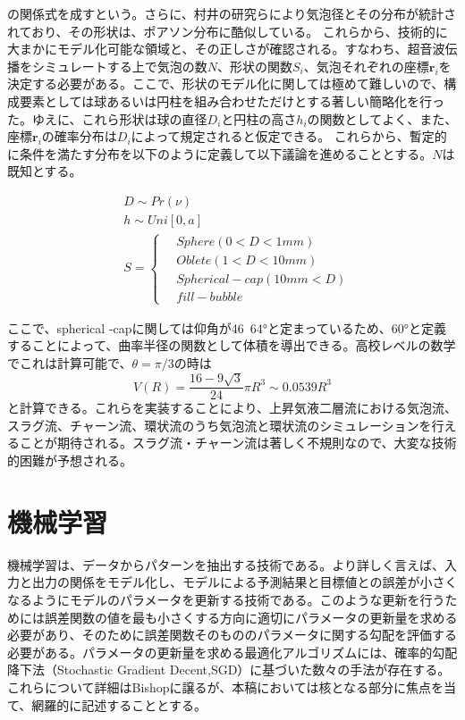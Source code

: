 \documentclass[uplatex]{suribt}
\begin{document}
の関係式を成すという。さらに、村井の研究\cite{村井祐一20222022.T011}らにより気泡径とその分布が統計されており、その形状は、ポアソン分布に酷似している。
これらから、技術的に大まかにモデル化可能な領域と、その正しさが確認される。すなわち、超音波伝播をシミュレートする上で気泡の数$N$、形状の関数$S_i$、気泡それぞれの座標$\mathbf{r}_i$を決定する必要がある。ここで、形状のモデル化に関しては極めて難しいので、構成要素としては球あるいは円柱を組み合わせただけとする著しい簡略化を行った。ゆえに、これら形状は球の直径$D_i$と円柱の高さ$h_i$の関数としてよく、また、座標$\mathbf{r}_i$の確率分布は$D_i$によって規定されると仮定できる。
これらから、暫定的に条件を満たす分布を以下のように定義して以下議論を進めることとする。$N$は既知とする。

\begin{align}
    &D \sim Pr(\nu) \\
    &h \sim Uni[0,a] \\
    &S =\left\{ \,
    \begin{aligned}
        &Sphere  (0 < D < 1 mm) \\
        &Oblete (1< D <10 mm)\\
        &Spherical-cap (10mm< D )\\
        &fill-bubble 
    \end{aligned}
\right.
\end{align}\par
ここで、spherical -capに関しては仰角が46~64°と定まっているため、60°と定義することによって、曲率半径の関数として体積を導出できる。高校レベルの数学でこれは計算可能で、$\theta=\pi/3$の時は
\begin{equation}
    V(R)=\frac{16-9\sqrt{3}}{24}\pi R^3\sim0.0539R^3
\end{equation}
と計算できる。これらを実装することにより、上昇気液二層流における気泡流、スラグ流、チャーン流、環状流のうち気泡流と環状流のシミュレーションを行えることが期待される。スラグ流・チャーン流は著しく不規則なので、大変な技術的困難が予想される。


\chapter{機械学習}
機械学習は、データからパターンを抽出する技術である。より詳しく言えば、入力と出力の関係をモデル化し、モデルによる予測結果と目標値との誤差が小さくなるようにモデルのパラメータを更新する技術である。このような更新を行うためには誤差関数の値を最も小さくする方向に適切にパラメータの更新量を求める必要があり、そのために誤差関数そのもののパラメータに関する勾配を評価する必要がある。パラメータの更新量を求める最適化アルゴリズムには、確率的勾配降下法（Stochastic Gradient Decent,SGD）に基づいた数々の手法が存在する。これらについて詳細はBishop\cite{Bishop:DeepLearning24}に譲るが、本稿においては核となる部分に焦点を当て、網羅的に記述することとする。
\end{document}
